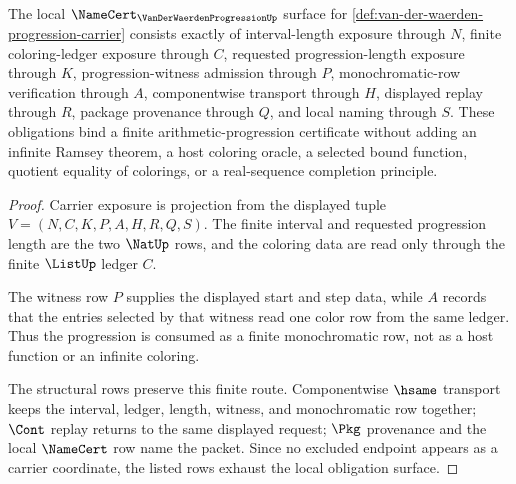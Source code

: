 \begin{theorem}
\label{thm:van-der-waerden-progression-namecert-obligations}
The local $\NameCert_{\VanDerWaerdenProgressionUp}$ surface for \autoref{def:van-der-waerden-progression-carrier} consists exactly of interval-length exposure through $N$, finite coloring-ledger exposure through $C$, requested progression-length exposure through $K$, progression-witness admission through $P$, monochromatic-row verification through $A$, componentwise transport through $H$, displayed replay through $R$, package provenance through $Q$, and local naming through $S$. These obligations bind a finite arithmetic-progression certificate without adding an infinite Ramsey theorem, a host coloring oracle, a selected bound function, quotient equality of colorings, or a real-sequence completion principle.
\end{theorem}
\begin{proof}
Carrier exposure is projection from the displayed tuple $V=(N,C,K,P,A,H,R,Q,S)$. The finite interval and requested progression length are the two $\NatUp$ rows, and the coloring data are read only through the finite $\ListUp$ ledger $C$.

The witness row $P$ supplies the displayed start and step data, while $A$ records that the entries selected by that witness read one color row from the same ledger. Thus the progression is consumed as a finite monochromatic row, not as a host function or an infinite coloring.

The structural rows preserve this finite route. Componentwise $\hsame$ transport keeps the interval, ledger, length, witness, and monochromatic row together; $\Cont$ replay returns to the same displayed request; $\Pkg$ provenance and the local $\NameCert$ row name the packet. Since no excluded endpoint appears as a carrier coordinate, the listed rows exhaust the local obligation surface.
\end{proof}

